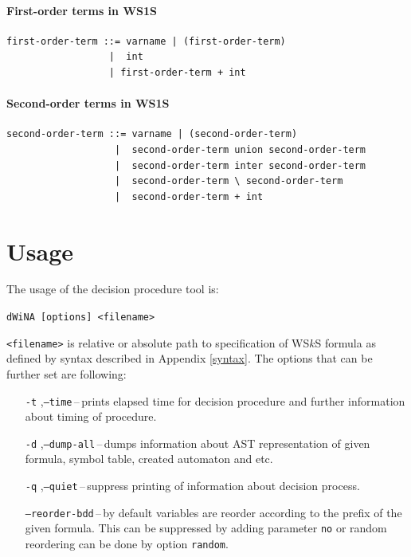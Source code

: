 \subsubsection{First-order terms in WS1S}
\begin{verbatim}
first-order-term ::= varname | (first-order-term)
                  |  int
                  | first-order-term + int
\end{verbatim}

\subsubsection{Second-order terms in WS1S}
\begin{verbatim}
second-order-term ::= varname | (second-order-term)
                   |  second-order-term union second-order-term
                   |  second-order-term inter second-order-term
                   |  second-order-term \ second-order-term
                   |  second-order-term + int
\end{verbatim}

\chapter{Usage}
The usage of the decision procedure tool is:
\begin{center}
 \texttt{dWiNA [options] <filename>}
\end{center}
\texttt{<filename>} is relative or absolute path to specification of WS$k$S
formula as defined by syntax described in Appendix \ref{syntax}. The options
that can be further set are following:
\begin{itemize}
  \item[\texttt{-t}],\texttt{--time}\,--\,prints elapsed time for decision
  procedure and further information about timing of procedure.
  \item[\texttt{-d}],\texttt{--dump-all}\,--\,dumps information about AST
  representation of given formula, symbol table, created automaton and etc.
  \item[\texttt{-q}],\texttt{--quiet}\,--\,suppress printing of information
  about decision process.
  \item[]\texttt{--reorder-bdd}\,--\,by default variables are reorder according
  to the prefix of the given formula. This can be suppressed by adding parameter
  \texttt{no} or random reordering can be done by option \texttt{random}.
\end{itemize}

